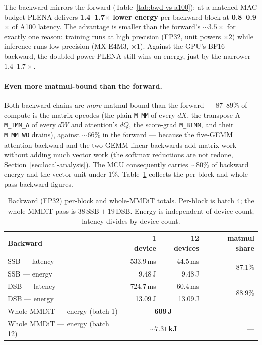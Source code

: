 \documentclass[11pt]{report}
\begin{document}
The backward mirrors the forward (Table~\ref{tab:bwd-vs-a100}): at a matched
MAC budget PLENA delivers \textbf{1.4--1.7$\times$ lower energy} per backward
block at \textbf{0.8--0.9$\times$} of A100 latency. The advantage is smaller
than the forward's ${\sim}3.5\times$ for exactly one reason: training runs at
high precision (FP32, unit powers $\times2$) while inference runs
low-precision (MX-E4M3, $\times1$). Against the GPU's BF16 backward, the
doubled-power PLENA still wins on energy, just by the narrower $1.4$--$1.7\times$.

\paragraph{Even more matmul-bound than the forward.} Both backward chains
are \emph{more} matmul-bound than the forward --- $87$--$89\%$ of compute is
the matrix opcodes (the plain \texttt{M\_MM} of every $dX$, the transpose-A
\texttt{M\_TMM\_A} of every $dW$ and attention's $dQ$, the score-grad
\texttt{M\_BTMM}, and their \texttt{M\_MM\_WO} drains), against ${\sim}66\%$ in
the forward --- because the five-GEMM attention backward and the two-GEMM
linear backwards add matrix work without adding much vector work (the softmax
reductions are not redone, Section~\ref{sec:local-analysis}). The MCU consequently carries ${\sim}80\%$
of backward energy and the vector unit under $1\%$. Table~\ref{tab:bwd-totals}
collects the per-block and whole-pass backward figures.

\begin{table}[h]
\centering
\caption{Backward (FP32) per-block and whole-MMDiT totals. Per-block is
batch 4; the whole-MMDiT pass is $38\,\text{SSB}+19\,\text{DSB}$. Energy is
independent of device count; latency divides by device count.}
\label{tab:bwd-totals}
\begin{tabular}{@{}lrrr@{}}
\toprule
Backward & 1 device & 12 devices & matmul share \\
\midrule
SSB --- latency & 533.9\,ms & 44.5\,ms & \multirow{2}{*}{87.1\%} \\
SSB --- energy & 9.48\,J & 9.48\,J & \\
DSB --- latency & 724.7\,ms & 60.4\,ms & \multirow{2}{*}{88.9\%} \\
DSB --- energy & 13.09\,J & 13.09\,J & \\
\midrule
Whole MMDiT --- energy (batch 1) & \multicolumn{2}{c}{\textbf{609\,J}} & --- \\
Whole MMDiT --- energy (batch 12) & \multicolumn{2}{c}{\textbf{${\sim}7.31$\,kJ}} & --- \\
\bottomrule
\end{tabular}
\end{table}
\end{document}
